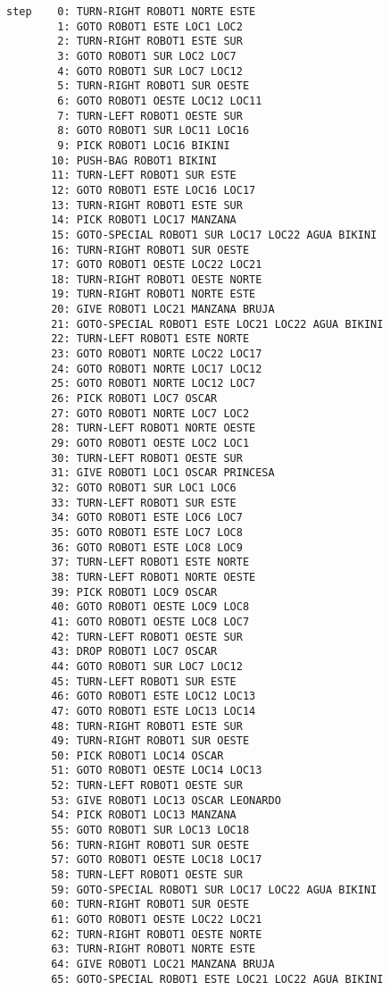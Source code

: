 \documentclass{article}
\begin{document}
\begin{lstlisting}
step    0: TURN-RIGHT ROBOT1 NORTE ESTE
        1: GOTO ROBOT1 ESTE LOC1 LOC2
        2: TURN-RIGHT ROBOT1 ESTE SUR
        3: GOTO ROBOT1 SUR LOC2 LOC7
        4: GOTO ROBOT1 SUR LOC7 LOC12
        5: TURN-RIGHT ROBOT1 SUR OESTE
        6: GOTO ROBOT1 OESTE LOC12 LOC11
        7: TURN-LEFT ROBOT1 OESTE SUR
        8: GOTO ROBOT1 SUR LOC11 LOC16
        9: PICK ROBOT1 LOC16 BIKINI
       10: PUSH-BAG ROBOT1 BIKINI
       11: TURN-LEFT ROBOT1 SUR ESTE
       12: GOTO ROBOT1 ESTE LOC16 LOC17
       13: TURN-RIGHT ROBOT1 ESTE SUR
       14: PICK ROBOT1 LOC17 MANZANA
       15: GOTO-SPECIAL ROBOT1 SUR LOC17 LOC22 AGUA BIKINI
       16: TURN-RIGHT ROBOT1 SUR OESTE
       17: GOTO ROBOT1 OESTE LOC22 LOC21
       18: TURN-RIGHT ROBOT1 OESTE NORTE
       19: TURN-RIGHT ROBOT1 NORTE ESTE
       20: GIVE ROBOT1 LOC21 MANZANA BRUJA
       21: GOTO-SPECIAL ROBOT1 ESTE LOC21 LOC22 AGUA BIKINI
       22: TURN-LEFT ROBOT1 ESTE NORTE
       23: GOTO ROBOT1 NORTE LOC22 LOC17
       24: GOTO ROBOT1 NORTE LOC17 LOC12
       25: GOTO ROBOT1 NORTE LOC12 LOC7
       26: PICK ROBOT1 LOC7 OSCAR
       27: GOTO ROBOT1 NORTE LOC7 LOC2
       28: TURN-LEFT ROBOT1 NORTE OESTE
       29: GOTO ROBOT1 OESTE LOC2 LOC1
       30: TURN-LEFT ROBOT1 OESTE SUR
       31: GIVE ROBOT1 LOC1 OSCAR PRINCESA
       32: GOTO ROBOT1 SUR LOC1 LOC6
       33: TURN-LEFT ROBOT1 SUR ESTE
       34: GOTO ROBOT1 ESTE LOC6 LOC7
       35: GOTO ROBOT1 ESTE LOC7 LOC8
       36: GOTO ROBOT1 ESTE LOC8 LOC9
       37: TURN-LEFT ROBOT1 ESTE NORTE
       38: TURN-LEFT ROBOT1 NORTE OESTE
       39: PICK ROBOT1 LOC9 OSCAR
       40: GOTO ROBOT1 OESTE LOC9 LOC8
       41: GOTO ROBOT1 OESTE LOC8 LOC7
       42: TURN-LEFT ROBOT1 OESTE SUR
       43: DROP ROBOT1 LOC7 OSCAR
       44: GOTO ROBOT1 SUR LOC7 LOC12
       45: TURN-LEFT ROBOT1 SUR ESTE
       46: GOTO ROBOT1 ESTE LOC12 LOC13
       47: GOTO ROBOT1 ESTE LOC13 LOC14
       48: TURN-RIGHT ROBOT1 ESTE SUR
       49: TURN-RIGHT ROBOT1 SUR OESTE
       50: PICK ROBOT1 LOC14 OSCAR
       51: GOTO ROBOT1 OESTE LOC14 LOC13
       52: TURN-LEFT ROBOT1 OESTE SUR
       53: GIVE ROBOT1 LOC13 OSCAR LEONARDO
       54: PICK ROBOT1 LOC13 MANZANA
       55: GOTO ROBOT1 SUR LOC13 LOC18
       56: TURN-RIGHT ROBOT1 SUR OESTE
       57: GOTO ROBOT1 OESTE LOC18 LOC17
       58: TURN-LEFT ROBOT1 OESTE SUR
       59: GOTO-SPECIAL ROBOT1 SUR LOC17 LOC22 AGUA BIKINI
       60: TURN-RIGHT ROBOT1 SUR OESTE
       61: GOTO ROBOT1 OESTE LOC22 LOC21
       62: TURN-RIGHT ROBOT1 OESTE NORTE
       63: TURN-RIGHT ROBOT1 NORTE ESTE
       64: GIVE ROBOT1 LOC21 MANZANA BRUJA
       65: GOTO-SPECIAL ROBOT1 ESTE LOC21 LOC22 AGUA BIKINI

\end{lstlisting}
\end{document}
